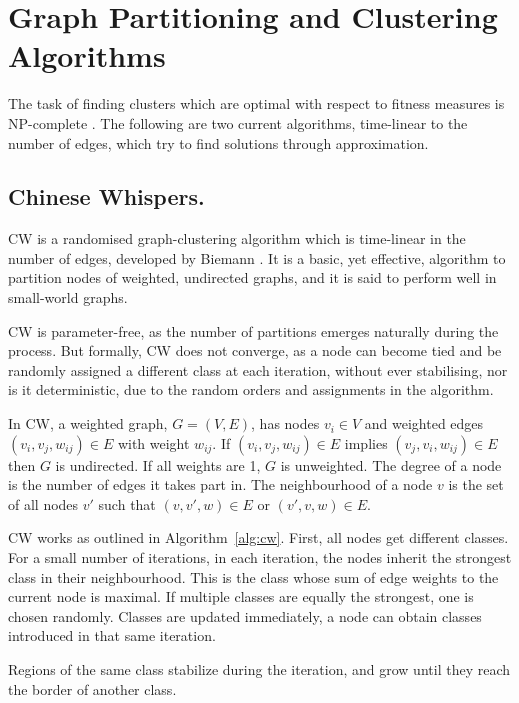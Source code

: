 \section{Graph Partitioning and Clustering Algorithms}
\label{sec:clusteralgorithms}

The task of finding clusters which are optimal with respect to fitness measures
is NP-complete \citep{sima2006np}. The following are two current algorithms,
time-linear to the number of edges, which try to find solutions through
approximation.

\subsection{Chinese Whispers.}
\label{sec:cw}

\ac{CW} is a randomised graph-clustering algorithm which is time-linear in the
number of edges, developed by Biemann \citep{biemann2006chinese}. It is a basic,
yet effective, algorithm to partition nodes of weighted, undirected graphs, and
it is said to perform well in small-world graphs.

\ac{CW} is parameter-free, as the number of partitions emerges naturally during
the process. But formally, \ac{CW} does not converge, as a node can become tied
and be randomly assigned a different class at each iteration, without ever
stabilising, nor is it deterministic, due to the random orders and assignments
in the algorithm.

In \ac{CW}, a weighted graph, $G=(V,E)$, has nodes $v_i \in V$ and weighted
edges $(v_i, v_j, w_{ij}) \in E$ with weight $w_{ij}$. If $(v_i, v_j, w_{ij})
\in E$ implies $(v_j, v_i, w_{ij}) \in E$ then $G$ is undirected. If all weights
are 1, $G$ is unweighted. The degree of a node is the number of edges it takes
part in. The neighbourhood of a node $v$ is the set of all nodes $v'$ such that
$(v,v',w) \in E$ or $(v',v,w) \in E$.

\ac{CW} works as outlined in Algorithm~\ref{alg:cw}. First, all nodes get
different classes. For a small number of iterations, in each iteration, the
nodes inherit the strongest class in their neighbourhood. This is the class
whose sum of edge weights to the current node is maximal. If multiple classes
are equally the strongest, one is chosen randomly. Classes are updated
immediately, a node can obtain classes introduced in that same iteration.

Regions of the same class stabilize during the iteration, and grow until they
reach the border of another class.

